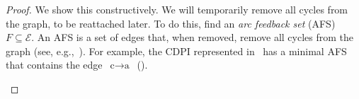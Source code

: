 \begin{proof}
We show this constructively. We will temporarily remove all cycles
from the graph, to be reattached later. To do this, find an \emph{arc
feedback set} (AFS) $F\subseteq\mathcal{E}$. An AFS is a set of edges
that, when removed, remove all cycles from the graph (see, e.g.,~\cite{golovach15incremental}).
For example, the CDPI represented in~ has a minimal
AFS that contains the edge~$\text{c}\rightarrow\text{a}$~(). 

\begin{figure}[H]
\hfill{}\hfill{}
\end{figure}
\end{proof}
